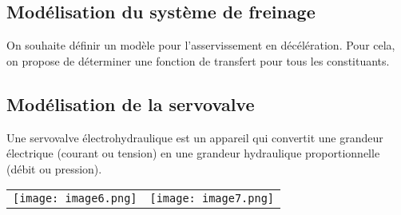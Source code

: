 \begin{multicols}{2}
\fi
\section*{Modélisation du système de freinage}

On souhaite définir un modèle pour l'asservissement en décélération. Pour cela, on propose de déterminer une fonction de transfert pour tous les constituants.




\subsection*{Modélisation de la servovalve}
\ifprof
\else

Une servovalve électrohydraulique est un appareil qui convertit une grandeur électrique (courant ou tension) en une grandeur hydraulique proportionnelle (débit ou pression).

\begin{center}
\begin{tabular}{cc}
\texttt{[image: image6.png]}&
\texttt{[image: image7.png]}
\end{tabular}
\end{center}
%
%
%
%


\end{multicols}

